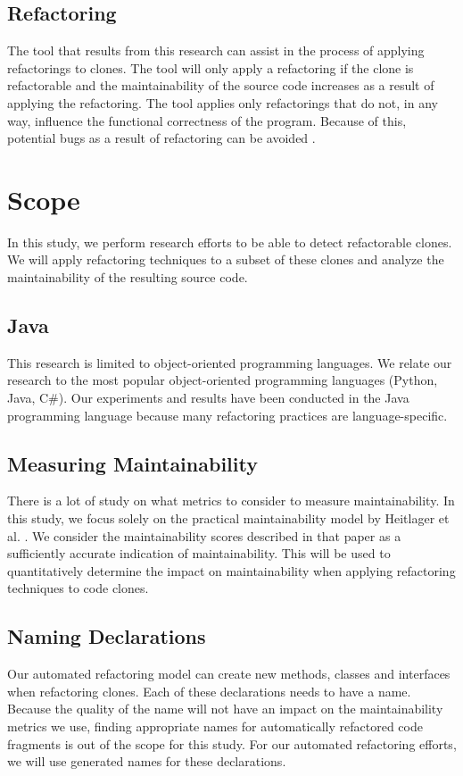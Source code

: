 \subsection{Refactoring}
The tool that results from this research can assist in the process of applying refactorings to clones. The tool will only apply a refactoring if the clone is refactorable and the maintainability of the source code increases as a result of applying the refactoring. The tool applies only refactorings that do not, in any way, influence the functional correctness of the program. Because of this, potential bugs as a result of refactoring can be avoided \cite{bavota2012does}.

\section{Scope}
In this study, we perform research efforts to be able to detect refactorable clones. We will apply refactoring techniques to a subset of these clones and analyze the maintainability of the resulting source code.

\subsection{Java}
This research is limited to object-oriented programming languages. We relate our research to the most popular object-oriented programming languages (Python, Java, C\#). Our experiments and results have been conducted in the Java programming language because many refactoring practices are language-specific.

\subsection{Measuring Maintainability}
There is a lot of study on what metrics to consider to measure maintainability. In this study, we focus solely on the practical maintainability model by Heitlager et al. \cite{heitlager2007practical}. We consider the maintainability scores described in that paper as a sufficiently accurate indication of maintainability. This will be used to quantitatively determine the impact on maintainability when applying refactoring techniques to code clones.

\subsection{Naming Declarations}
Our automated refactoring model can create new methods, classes and interfaces when refactoring clones. Each of these declarations needs to have a name. Because the quality of the name will not have an impact on the maintainability metrics we use, finding appropriate names for automatically refactored code fragments is out of the scope for this study. For our automated refactoring efforts, we will use generated names for these declarations. %

